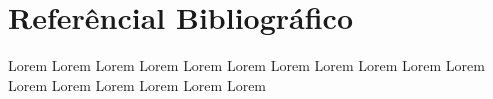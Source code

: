 \section{Referêncial Bibliográfico}

Lorem \cite{appcache01}
Lorem \cite{browserscope}
Lorem \cite{hawkes2011foundation}
Lorem \cite{html5boilerplate}
Lorem \cite{html5mozilla}
Lorem \cite{jogandoeaprendendo}
Lorem \cite{lubbers2010pro}
Lorem \cite{meyer2011essential}
Lorem \cite{nativeapp}
Lorem \cite{newtechnologies2010}
Lorem \cite{pilgrim2010html5}
Lorem \cite{phan2010mobile}
Lorem \cite{powell2003html}
Lorem \cite{souders2007high}
Lorem \cite{souders2009even}
Lorem \cite{w3ccanvas}
Lorem \cite{whatwg01}

%
